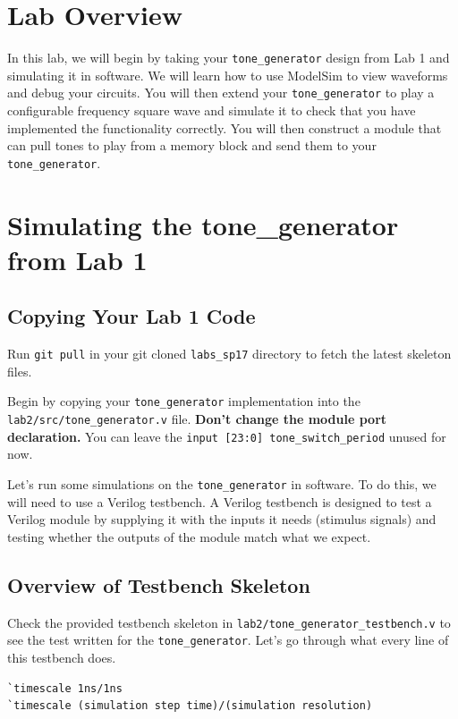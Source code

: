 \documentclass[11pt]{article}
\begin{document}
\section{Lab Overview}

In this lab, we will begin by taking your \verb|tone_generator| design from Lab 1 and simulating it in software. We will learn how to use ModelSim to view waveforms and debug your circuits. You will then extend your \verb|tone_generator| to play a configurable frequency square wave and simulate it to check that you have implemented the functionality correctly. You will then construct a module that can pull tones to play from a memory block and send them to your \verb|tone_generator|.

\section{Simulating the tone\_generator from Lab 1}

\subsection{Copying Your Lab 1 Code}

Run \verb|git pull| in your git cloned \verb|labs_sp17| directory to fetch the latest skeleton files.

Begin by copying your \verb|tone_generator| implementation into the \verb|lab2/src/tone_generator.v| file. \textbf{Don't change the module port declaration.} You can leave the \verb|input [23:0] tone_switch_period| unused for now.

Let's run some simulations on the \verb|tone_generator| in software. To do this, we will need to use a Verilog testbench. A Verilog testbench is designed to test a Verilog module by supplying it with the inputs it needs (stimulus signals) and testing whether the outputs of the module match what we expect.

\subsection{Overview of Testbench Skeleton}
Check the provided testbench skeleton in \verb|lab2/tone_generator_testbench.v| to see the test written for the \verb|tone_generator|. Let's go through what every line of this testbench does.

\begin{verbatim}
`timescale 1ns/1ns
`timescale (simulation step time)/(simulation resolution)
\end{verbatim}
\end{document}
